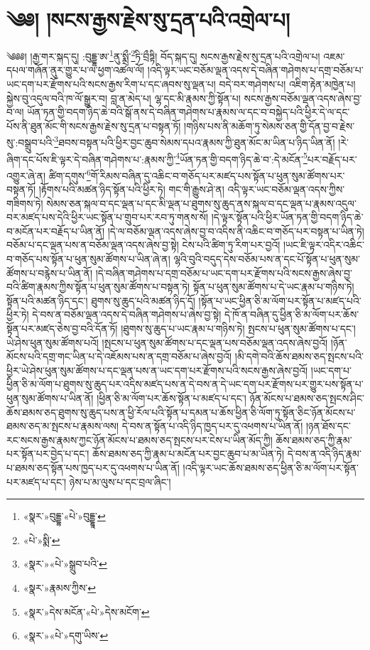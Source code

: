\chapter{༄༅། །སངས་རྒྱས་རྗེས་སུ་དྲན་པའི་འགྲེལ་པ།}༄༅༅། །རྒྱ་གར་སྐད་དུ། :བུདྡྷ་ཨ་\footnote{«སྣར་»བུདྡྷ་«པེ་»བུདྡྷཱ་}ནུ་སྨྲྀ་\footnote{«པེ་»སྨི་}ཏི་བྲྀཏྟི། བོད་སྐད་དུ། སངས་རྒྱས་རྗེས་སུ་དྲན་པའི་འགྲེལ་པ། འཇམ་དཔལ་གཞོན་ནུར་གྱུར་པ་ལ་ཕྱག་འཚལ་ལོ། །འདི་ལྟར་ཡང་བཅོམ་ལྡན་འདས་དེ་བཞིན་གཤེགས་པ་དགྲ་བཅོམ་པ་ཡང་དག་པར་རྫོགས་པའི་སངས་རྒྱས་རིག་པ་དང་ཞབས་སུ་ལྡན་པ། བདེ་བར་གཤེགས་པ། འཇིག་རྟེན་མཁྱེན་པ། སྐྱེས་བུ་འདུལ་བའི་ཁ་ལོ་སྒྱུར་བ། བླ་ན་མེད་པ། ལྷ་དང་མི་རྣམས་ཀྱི་སྟོན་པ། སངས་རྒྱས་བཅོམ་ལྡན་འདས་ཞེས་བྱ་བ་ལ། ཡོན་ཏན་གྱི་བདག་ཉིད་ཆེ་བའི་སྒོ་ནས་དེ་བཞིན་གཤེགས་པ་རྣམས་ལ་དང་བ་བསྐྱེད་པའི་ཕྱིར་དེ་ལ་དང་པོས་ནི་ཐུན་མོང་གི་སངས་རྒྱས་རྗེས་སུ་དྲན་པ་བསྟན་ཏོ། །གཉིས་པས་ནི་མཆོག་ཏུ་སེམས་ཅན་གྱི་དོན་བྱ་བ་རྗེས་སུ་:བསྒྲུབ་པའི་\footnote{«སྣར་»«པེ་»སྒྲུབ་པའི་}ཐབས་བསྟན་པའི་ཕྱིར་བྱང་ཆུབ་སེམས་དཔའ་རྣམས་ཀྱི་ཐུན་མོང་མ་ཡིན་པ་ཉིད་ཡིན་ནོ། །རེ་ཞིག་དང་པོས་ཇི་ལྟར་དེ་བཞིན་གཤེགས་པ་:རྣམས་ཀྱི་\footnote{«སྣར་»རྣམས་ཀྱིས་}ཡོན་ཏན་གྱི་བདག་ཉིད་ཆེ་བ་:དེ་མངོན་\footnote{«སྣར་»དེས་མངོན་«པེ་»དེས་མངོག་}པར་བརྗོད་པར་འགྱུར་ཞེ་ན། ཚིག་དགུས་\footnote{«སྣར་»«པེ་»དགུ་ཡིས་}གོ་རིམས་བཞིན་དུ་འཆིང་བ་གཅོད་པར་མཛད་པས་སྟོན་པ་ཕུན་སུམ་ཚོགས་པར་བསྟན་ཏོ། །རྟོགས་པའི་མཚན་ཉིད་སྟོན་པའི་ཕྱིར་ཏེ། གང་གི་རྒྱུས་ཤེ་ན། འདི་ལྟར་ཡང་བཅོམ་ལྡན་འདས་ཀྱིས་གཟིགས་ཏེ། སེམས་ཅན་སྐལ་བ་དང་ལྡན་པ་དང་མི་ལྡན་པ་ཐུགས་སུ་ཆུད་ནས་སྐལ་བ་དང་ལྡན་པ་རྣམས་འདུལ་བར་མཛད་པས་དེའི་ཕྱིར་ཡང་སྟོན་པ་གྲུབ་པར་རབ་ཏུ་གནས་སོ། །དེ་ལྟར་སྟོན་པའི་ཕྱིར་ཡོན་ཏན་གྱི་བདག་ཉིད་ཆེ་བ་མངོན་པར་བརྗོད་པ་ཡིན་ནོ། །དེ་ལ་བཅོམ་ལྡན་འདས་ཞེས་བྱ་བ་འདིས་ནི་འཆིང་བ་གཅོད་པར་བསྟན་པ་ཡིན་ཏེ། བཅོམ་པ་དང་ལྡན་པས་ན་བཅོམ་ལྡན་འདས་ཞེས་བྱ་སྟེ། ངེས་པའི་ཚིག་ཏུ་རིག་པར་བྱའོ། །ཡང་ཇི་ལྟར་འདིར་འཆིང་བ་གཅོད་པས་སྟོན་པ་ཕུན་སུམ་ཚོགས་པ་ཡིན་ཞེ་ན། ལྷའི་བུའི་བདུད་དེས་བཅོམ་པས་ན་དང་པོ་སྟོན་པ་ཕུན་སུམ་ཚོགས་པ་བརྙེས་པ་ཡིན་ནོ། །དེ་བཞིན་གཤེགས་པ་དགྲ་བཅོམ་པ་ཡང་དག་པར་རྫོགས་པའི་སངས་རྒྱས་ཞེས་བྱ་བའི་ཚིག་རྣམས་ཀྱིས་སྟོན་པ་ཕུན་སུམ་ཚོགས་པ་བསྟན་ཏེ། སྟོན་པ་ཕུན་སུམ་ཚོགས་པ་དེ་ཡང་རྣམ་པ་གཉིས་ཏེ། སྟོན་པའི་མཚན་ཉིད་དང་། ཐུགས་སུ་ཆུད་པའི་མཚན་ཉིད་དོ། །སྟོན་པ་ཡང་ཕྱིན་ཅི་མ་ལོག་པར་སྟོན་པ་མཛད་པའི་ཕྱིར་ཏེ། དེ་བས་ན་བཅོམ་ལྡན་འདས་དེ་བཞིན་གཤེགས་པ་ཞེས་བྱ་སྟེ། དེ་ཁོ་ན་བཞིན་དུ་ཕྱིན་ཅི་མ་ལོག་པར་ཆོས་སྟོན་པར་མཛད་ཅེས་བྱ་བའི་དོན་ཏོ། །ཐུགས་སུ་ཆུད་པ་ཡང་རྣམ་པ་གཉིས་ཏེ། སྤངས་པ་ཕུན་སུམ་ཚོགས་པ་དང་། ཡེ་ཤེས་ཕུན་སུམ་ཚོགས་པའོ། །སྤངས་པ་ཕུན་སུམ་ཚོགས་པ་དང་ལྡན་པས་བཅོམ་ལྡན་འདས་ཞེས་བྱའོ། །ཉོན་མོངས་པའི་དགྲ་གང་ཡིན་པ་དེ་འཇོམས་པས་ན་དགྲ་བཅོམ་པ་ཞེས་བྱའོ། །མི་དགེ་བའི་ཆོས་ཐམས་ཅད་སྤངས་པའི་ཕྱིར་ཡེ་ཤེས་ཕུན་སུམ་ཚོགས་པ་དང་ལྡན་པས་ན་ཡང་དག་པར་རྫོགས་པའི་སངས་རྒྱས་ཞེས་བྱའོ། །ཡང་དག་པ་ཕྱིན་ཅི་མ་ལོག་པ་ཐུགས་སུ་ཆུད་པར་འདིས་མཛད་པས་ན་དེ་བས་ན་དེ་ཡང་དག་པར་རྫོགས་པར་གྱུར་པས་སྟོན་པ་ཕུན་སུམ་ཚོགས་པ་ཡིན་ནོ། །ཕྱིན་ཅི་མ་ལོག་པར་ཆོས་སྟོན་པ་མཛད་པ་དང་། ཉོན་མོངས་པ་ཐམས་ཅད་སྤངས་ཤིང་ཆོས་ཐམས་ཅད་ཐུགས་སུ་ཆུད་པས་ན་ཕྱི་རོལ་པའི་སྟོན་པ་དམན་པ་ཆོས་ཕྱིན་ཅི་ལོག་ཏུ་སྟོན་ཅིང་ཉོན་མོངས་པ་ཐམས་ཅད་མ་སྤངས་པ་རྣམས་ལས། དེ་བས་ན་སྟོན་པ་འདི་ཉིད་ཁྱད་པར་དུ་འཕགས་པ་ཡིན་ནོ། །ཉན་ཐོས་དང་རང་སངས་རྒྱས་རྣམས་ཀྱང་ཉོན་མོངས་པ་ཐམས་ཅད་སྤངས་པར་ངེས་པ་ཡིན་མོད་ཀྱི། ཆོས་ཐམས་ཅད་ཀྱི་རྣམ་པར་སྟོན་པར་བྱེད་པ་དང་། ཆོས་ཐམས་ཅད་ཀྱི་རྣམ་པ་མངོན་པར་བྱང་ཆུབ་པ་མ་ཡིན་ཏེ། དེ་བས་ན་འདི་ཉིད་རྣམ་པ་ཐམས་ཅད་སྟོན་པས་ཁྱད་པར་དུ་འཕགས་པ་ཡིན་ནོ། །འདི་ལྟར་ཡང་ཆོས་ཐམས་ཅད་ཕྱིན་ཅི་མ་ལོག་པར་སྟོན་པར་མཛད་པ་དང་། ཉེས་པ་མ་ལུས་པ་དང་བྲལ་ཞིང་། 